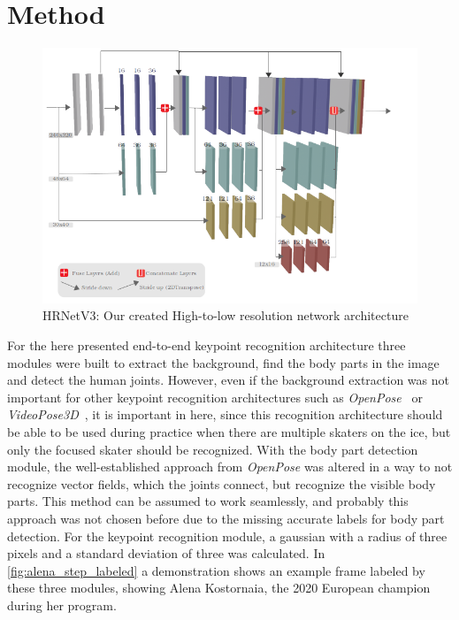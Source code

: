 

\chapter{Method} %

\label{method} %


\vspace*{\fill}
\begin{figure}[th]
    \centering
    \includegraphics[width=150mm]{Figures/custom_hrnet_lines.png}
    \decoRule
    \caption[HRNetV3: Our HRNet Architecture]{HRNetV3: Our created High-to-low resolution network architecture}
    \label{fig:custom_hrnet}
\end{figure}
For the here presented end-to-end keypoint recognition architecture three modules were built to extract the background,
find the body parts in the image and detect the human joints.
However, even if the background extraction was not important for other keypoint recognition architectures such as
\textit{OpenPose}~\cite{openpose} or \textit{VideoPose3D}~\cite{videopose3d}, it is important in here, since
this recognition architecture should be able to be used during practice when there are multiple skaters on the ice,
but only the focused skater should be recognized.
With the body part detection module, the well-established approach from \textit{OpenPose} was altered
in a way to not recognize vector
fields, which the joints connect, but recognize the visible body parts.
This method can be assumed to work seamlessly, and probably this approach was not chosen before due to the missing
accurate labels for body part detection.
For the keypoint recognition module, a gaussian with a radius of three pixels and a standard deviation of
three was calculated.
In \autoref{fig:alena_step_labeled} a demonstration shows an example frame labeled by these three modules,
showing Alena Kostornaia, the 2020 European champion during her program.

